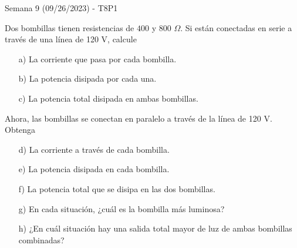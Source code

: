\begin{frame}{Semana 9 (09/26/2023) - T8P1}
    
    Dos bombillas tienen
resistencias de $400$ y $800$ $\Omega$. Si están conectadas en serie a través 
de una línea de 120 V, calcule 
    
    \begin{itemize}
        \item[a)] La corriente que pasa por cada bombilla.
        \item[b)] La potencia disipada por cada una.
        \item[c)] La potencia total disipada
en ambas bombillas.
    \end{itemize}

    Ahora, las bombillas se conectan en paralelo a
través de la línea de 120 V. Obtenga

    \begin{itemize}
        \item[d)] La corriente a través de cada
bombilla.
        \item[e)] La potencia disipada en cada bombilla.
        \item[f)] La potencia total
que se disipa en las dos bombillas.
        \item[g)] En cada situación, ¿cuál es la
bombilla más luminosa?
        \item[h)] ¿En cuál situación hay una salida total
mayor de luz de ambas bombillas combinadas?
    \end{itemize}
    
\end{frame}

